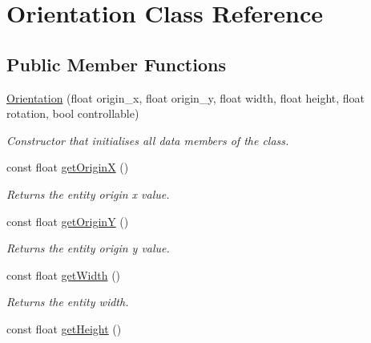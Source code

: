 \hypertarget{class_orientation}{\section{Orientation Class Reference}
\label{class_orientation}
}
\subsection*{Public Member Functions}
\begin{DoxyCompactItemize}
\item 
\hypertarget{class_orientation_ae2df457b68375ea4915f7fa1c161b116}{\hyperlink{class_orientation_ae2df457b68375ea4915f7fa1c161b116}{Orientation} (float origin\+\_\+x, float origin\+\_\+y, float width, float height, float rotation, bool controllable)}\label{class_orientation_ae2df457b68375ea4915f7fa1c161b116}

\begin{DoxyCompactList}\small\item\em Constructor that initialises all data members of the class. \end{DoxyCompactList}\item 
\hypertarget{class_orientation_a4d6b853f2ac00965d29e5bc36b94c949}{const float \hyperlink{class_orientation_a4d6b853f2ac00965d29e5bc36b94c949}{get\+Origin\+X} ()}\label{class_orientation_a4d6b853f2ac00965d29e5bc36b94c949}

\begin{DoxyCompactList}\small\item\em Returns the entity origin x value. \end{DoxyCompactList}\item 
\hypertarget{class_orientation_ae60c88b0525d6e536a1a068d3a99f74c}{const float \hyperlink{class_orientation_ae60c88b0525d6e536a1a068d3a99f74c}{get\+Origin\+Y} ()}\label{class_orientation_ae60c88b0525d6e536a1a068d3a99f74c}

\begin{DoxyCompactList}\small\item\em Returns the entity origin y value. \end{DoxyCompactList}\item 
\hypertarget{class_orientation_adf3e031c3ce102233782e6fdeb976ef3}{const float \hyperlink{class_orientation_adf3e031c3ce102233782e6fdeb976ef3}{get\+Width} ()}\label{class_orientation_adf3e031c3ce102233782e6fdeb976ef3}

\begin{DoxyCompactList}\small\item\em Returns the entity width. \end{DoxyCompactList}\item 
\hypertarget{class_orientation_af7c9a2f7547c76ce2408ac6fefacf9e1}{const float \hyperlink{class_orientation_af7c9a2f7547c76ce2408ac6fefacf9e1}{get\+Height} ()}\label{class_orientation_af7c9a2f7547c76ce2408ac6fefacf9e1}


\end{DoxyCompactItemize}
